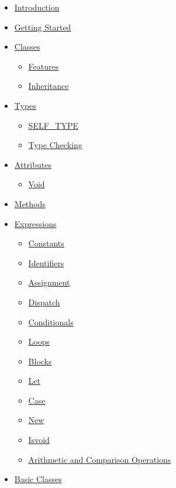 \documentclass[]{article}
\begin{document}
\begin{itemize}
\itemsep1pt\parskip0pt
\item
  \href{node2.html}{Introduction}
\item
  \href{node3.html}{Getting Started}
\item
  \href{node4.html}{Classes}

  \begin{itemize}
  \itemsep1pt\parskip0pt
  \item
    \href{node5.html}{Features}
  \item
    \href{node6.html}{Inheritance}
  \end{itemize}
\item
  \href{node7.html}{Types}

  \begin{itemize}
  \itemsep1pt\parskip0pt
  \item
    \href{node8.html}{SELF\_TYPE}
  \item
    \href{node9.html}{Type Checking}
  \end{itemize}
\item
  \href{node10.html}{Attributes}

  \begin{itemize}
  \itemsep1pt\parskip0pt
  \item
    \href{node11.html}{Void}
  \end{itemize}
\item
  \href{node12.html}{Methods}
\item
  \href{node13.html}{Expressions}

  \begin{itemize}
  \itemsep1pt\parskip0pt
  \item
    \href{node14.html}{Constants}
  \item
    \href{node15.html}{Identifiers}
  \item
    \href{node16.html}{Assignment}
  \item
    \href{node17.html}{Dispatch}
  \item
    \href{node18.html}{Conditionals}
  \item
    \href{node19.html}{Loops}
  \item
    \href{node20.html}{Blocks}
  \item
    \href{node21.html}{Let}
  \item
    \href{node22.html}{Case}
  \item
    \href{node23.html}{New}
  \item
    \href{node24.html}{Isvoid}
  \item
    \href{node25.html}{Arithmetic and Comparison Operations}
  \end{itemize}
\item
  \href{node26.html}{Basic Classes}


\end{itemize}
\end{document}
